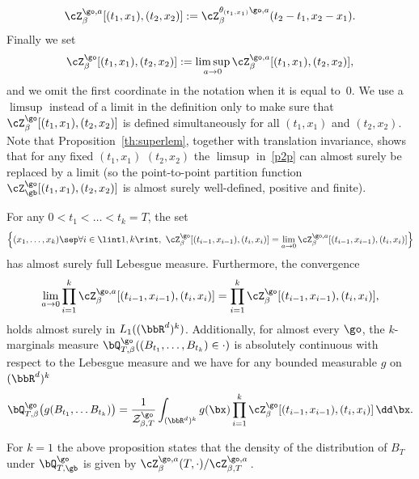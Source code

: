 \begin{equation}
\cZ^{\go,a}_{\beta}[(t_1,x_1),(t_2,x_2)]:= \cZ^{\theta_{(t_1,x_1)}\go,a}_{\beta}(t_2-t_1, x_2-x_1).
\end{equation}
Finally we set
\begin{equation}
\label{p2p}
\cZ^{\go}_{\beta}[(t_1,x_1),(t_2,x_2)]:= \limsup_{a\to 0} \cZ^{\go,a}_{\beta}[(t_1,x_1),(t_2,x_2)],
\end{equation}
and we omit the first coordinate in the notation when it is equal to~$0$.
We use a $\limsup$ instead of a limit in the definition only to make sure that $\cZ^{\go}_{\beta}[(t_1,x_1),(t_2,x_2)]$ is defined simultaneously for all $(t_1,x_1)$ and $(t_2,x_2)$.
Note that Proposition~\ref{th:superlem}, togeth\-er with translation invariance, shows that
for any fixed $(t_1,x_1)$ $(t_2,x_2)$
the $\limsup$ in~\eqref{p2p} can almost surely be replaced by a limit (so the point-to-point partition function
$\cZ_{\gb}^{\go}[(t_1,x_1),(t_2,x_2)]$
is almost surely well-defined, positive and finite).

\begin{proposition}
\label{twomarg}
For any $0<t_1<\dots<t_k=T$,
the set
\[
\Bigl\{ (x_1, \ldots, x_k) \sep \forall i\in \lint 1,k\rint,\ \cZ^{\go}_{\beta}[(t_{i-1},x_{i-1}),(t_i,x_{i})] = \lim_{a\to 0} \cZ^{\go,a}_{\beta}[(t_{i-1},x_{i-1}),(t_i,x_{i})] \Bigr\}
\]
has almost surely full Lebesgue measure.
Furthermore, the convergence
\begin{equation}
\lim_{a\to 0}\prod_{i=1}^k \cZ^{\go,a}_{\beta}[(t_{i-1},x_{i-1}),(t_i,x_{i})]=\prod_{i=1}^k \cZ^{\go}_{\beta}[(t_{i-1},x_{i-1}),(t_i,x_{i})],
\end{equation}
holds almost surely in $L_1((\bbR^{d})^{k})$.
Additionally, for almost every $\go$, the $k$-marginals measure $\bQ^{\go}_{T,\beta}((B_{t_1},\dots, B_{t_k})\in \cdot)$ is absolutely continuous with respect to the Lebesgue measure
and we have for any bounded measurable $g$ on $(\bbR^{d})^{k}$
\begin{equation}
\bQ^{\go}_{T,\beta} \bigl(g(B_{t_1},\dots B_{t_k}) \bigr)= \frac{1 }{\mathcal Z^{\go}_{\beta,T}} \int_{(\bbR^d)^k} g(\bx)\prod_{i=1}^k \cZ^{\go}_{\beta}[(t_{i-1},x_{i-1}),(t_i,x_{i})] \,\dd \bx.
\end{equation}
\end{proposition}

\begin{rem}
For $k=1$ the above proposition states that the density of the distribution of $B_T$ under $\bQ_{T,\gb}^{\go}$ is given by $\cZ^{\go,a}_{\beta}(T,\cdot)/\cZ^{\go,a}_{\beta,T}\,$.
\end{rem}

